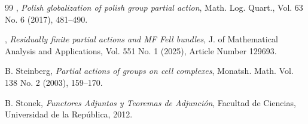\documentclass[sn-mathphys-num]{sn-jnl}%
\theoremstyle{thmstyleone}%
\theoremstyle{thmstyletwo}%
\theoremstyle{thmstylethree}%
\begin{document}
\begin{thebibliography}{99}
, {\em Polish globalization of polish group partial action}, Math. Log. Quart., Vol. 63 No. 6 (2017), 481--490.


, {\em Residually finite partial actions and MF Fell bundles}, J. of Mathematical Analysis and Applications, Vol. 551 No. 1 (2025), Article Number 129693.

{\sc B. Steinberg}, {\em Partial actions of groups on cell complexes},
 Monatsh. Math. Vol.
138 No. 2 (2003), 159--170.

{\sc B. Stonek}, {\em Functores Adjuntos y Teoremas de Adjunción},
Facultad de Ciencias, Universidad de la República,  2012.



\end{thebibliography}
\end{document}

